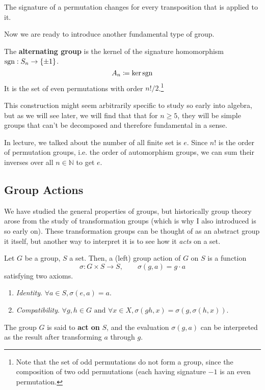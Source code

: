   \begin{lemma}
    The signature of a permutation changes for every transposition that is applied to it. 
  \end{lemma} 

  Now we are ready to introduce another fundamental type of group. 

  \begin{definition}
    The \textbf{alternating group} is the kernel of the signature homomorphism $\sign: S_n \to \{\pm 1\}$. 
    \begin{equation}
      A_n \coloneqq \ker{\sign}
    \end{equation}
    It is the set of even permutations with order $n!/2$.\footnote{Note that the set of odd permutations do not form a group, since the composition of two odd permutations (each having signature $-1$ is an even permutation. }
  \end{definition}

  This construction might seem arbitrarily specific to study so early into algebra, but as we will see later, we will find that that for $n \geq 5$, they will be simple groups that can't be decomposed and therefore fundamental in a sense. 

  In lecture, we talked about the number of all finite set is $e$. Since $n!$ is the order of permutation groups, i.e. the order of automorphism groups, we can sum their inverses over all $n \in \mathbb{N}$ to get $e$.  

\subsection{Group Actions} 

  We have studied the general properties of groups, but historically group theory arose from the study of transformation groups (which is why I also introduced is so early on). These transformation groups can be thought of as an abstract group it itself, but another way to interpret it is to see how it \textit{acts} on a set. 

  \begin{definition}
    Let $G$ be a group, $S$ a set. Then, a (left) group action of $G$ on $S$ is a function
    \begin{equation}
      \sigma: G \times S \to S, \qquad \sigma(g, a) = g \cdot a 
    \end{equation}
    satisfying two axioms. 
    \begin{enumerate}
      \item \textit{Identity}. $\forall a \in S, \sigma(e, a) = a$. 
      \item \textit{Compatibility}. $\forall g, h \in G \text{ and } \forall x \in X, \sigma(gh, x) = \sigma(g, \sigma(h, x))$.
    \end{enumerate}
    The group $G$ is said to \textbf{act on} $S$, and the evaluation $\sigma(g, a)$ can be interpreted as the result after transforming $a$ through $g$. 
  \end{definition}
  
